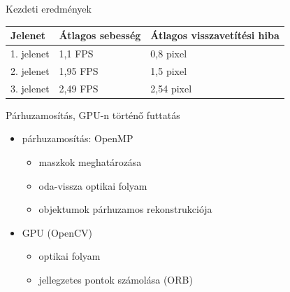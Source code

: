 \begin{frame}[c]{Kezdeti eredmények}

\centering
\begin{tabular}{|l|l|l|}
\hline
\textbf{Jelenet} & \textbf{Átlagos sebesség} & \textbf{Átlagos visszavetítési hiba} \\ \hline\hline

1. jelenet & 1,1 FPS & 0,8 pixel \\\hline
2. jelenet & 1,95 FPS & 1,5 pixel \\\hline
3. jelenet & 2,49 FPS & 2,54 pixel \\\hline
\end{tabular}

\end{frame}

\begin{frame}{Párhuzamosítás, GPU-n történő futtatás}

\begin{itemize}
\item párhuzamosítás: OpenMP
\begin{itemize}
\item maszkok meghatározása
\item oda-vissza optikai folyam
\item objektumok párhuzamos rekonstrukciója
\end{itemize}
\item GPU (OpenCV)
\begin{itemize}
\item optikai folyam
\item {\color{lightgray}jellegzetes pontok számolása (ORB)}
\end{itemize}
\end{itemize}

\end{frame}

